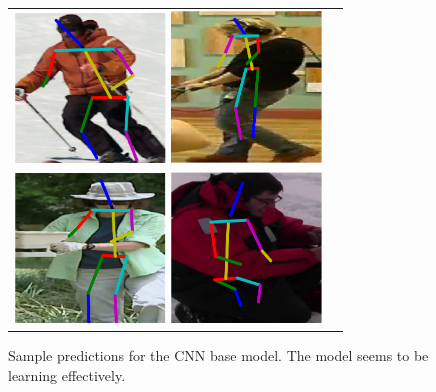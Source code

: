 \documentclass[11pt,twocolumn,letterpaper]{article}
\begin{document}
\begin{figure}
\begin{tabular}{cc}
\includegraphics[width=40mm]{images/base_1}
\includegraphics[width=40mm]{images/base_2}\\
\includegraphics[width=40mm]{images/base_3}
\includegraphics[width=40mm]{images/base_4}\\
\end{tabular}
\caption{Sample predictions for the CNN base model. The model seems to be learning
    effectively.}
\label{fig:base_images}
\end{figure}
\end{document}
